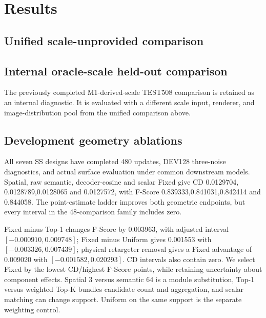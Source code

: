 \section{Results}
\subsection{Unified scale-unprovided comparison}

\subsection{Internal oracle-scale held-out comparison}
\ifFinalReportReady


\else
The previously completed M1-derived-scale TEST508 comparison is retained as
an internal diagnostic. It is evaluated with a different scale input,
renderer, and image-distribution pool from the unified comparison above.
\fi

\subsection{Development geometry ablations}

All seven SS designs have completed 480 updates, DEV128 three-noise
diagnostics, and actual surface evaluation under common downstream models.
Spatial, raw semantic, decoder-cosine and scalar Fixed give CD 0.0129704,
0.0128789,0.0128065 and 0.0127572, with F-Score 0.839333,0.841031,0.842414
and 0.844058. The point-estimate ladder improves both geometric endpoints,
but every interval in the 48-comparison family includes zero.

Fixed minus Top-1 changes F-Score by 0.003963, with adjusted
interval $[-0.000910,0.009748]$; Fixed minus Uniform gives 0.001553 with
$[-0.003326,0.007439]$; physical retargeter removal gives a Fixed advantage
of 0.009020 with $[-0.001582,0.020293]$. CD intervals also contain zero.
We select Fixed by the lowest CD/highest F-Score points, while retaining
uncertainty about component effects. Spatial 3 versus semantic 64 is a
module substitution, Top-1 versus weighted Top-K bundles candidate count
and aggregation, and scalar matching can change support. Uniform on the
same support is the separate weighting control.

